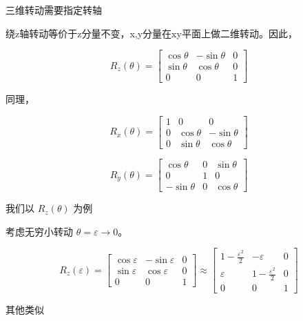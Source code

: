 \documentclass[lang=cn,10pt]{elegantbook}
\begin{document}
三维转动需要指定转轴

绕z轴转动等价于z分量不变，x,y分量在xy平面上做二维转动。因此，

\[
R_z(\theta) = \begin{bmatrix}
	\cos\theta & -\sin\theta & 0 \\
	\sin\theta & \cos\theta & 0 \\
	0 & 0 & 1
\end{bmatrix}
\]

同理，

\[
R_x(\theta) = \begin{bmatrix}
	1 & 0 & 0 \\
	0 & \cos\theta & -\sin\theta \\
	0 & \sin\theta & \cos\theta
\end{bmatrix}
\]

\[
R_y(\theta) = \begin{bmatrix}
	\cos\theta & 0 & \sin\theta \\
	0 & 1 & 0 \\
	-\sin\theta & 0 & \cos\theta
\end{bmatrix}
\]

我们以 \( R_{z}(\theta) \) 为例

考虑无穷小转动 \( \theta = \varepsilon \rightarrow 0 \)。

\[
R_z(\varepsilon) = \begin{bmatrix}
	\cos\varepsilon & -\sin\varepsilon & 0 \\
	\sin\varepsilon & \cos\varepsilon & 0 \\
	0 & 0 & 1
\end{bmatrix}
\approx \begin{bmatrix}
	1 - \frac{\varepsilon^2}{2} & -\varepsilon & 0 \\
	\varepsilon & 1 - \frac{\varepsilon^2}{2} & 0 \\
	0 & 0 & 1
\end{bmatrix}
\]

其他类似
\end{document}
